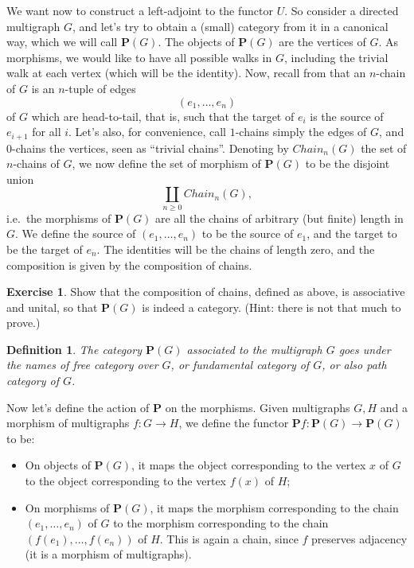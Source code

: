 \documentclass[12pt,oneside,headings=small]{scrbook}
\numberwithin{equation}{section}
\theoremstyle{plain}
\newtheorem{deph}[thm]{Definition}
\theoremstyle{definition}
\newtheorem{ex}[thm]{Exercise}
\newcommand{\cat}[1]{{\mathbf{#1}}} %
\DeclareMathOperator{\1}{\mathbbm{1}}
\DeclareMathOperator{\2}{\mathbbm{2}}
\begin{document}
We want now to construct a left-adjoint to the functor $U$. So consider a directed multigraph $G$, and let's try to obtain a (small) category from it in a canonical way, which we will call $\cat{P}(G)$. The objects of $\cat{P}(G)$ are the vertices of $G$. As morphisms, we would like to have all possible walks in $G$, including the trivial walk at each vertex (which will be the identity). Now, recall from  that an $n$-chain of $G$ is an $n$-tuple of edges 
$$
(e_1,\dots,e_n)
$$ 
of $G$ which are head-to-tail, that is, such that the target of $e_i$ is the source of $e_{i+1}$ for all $i$. Let's also, for convenience, call $1$-chains simply the edges of $G$, and $0$-chains the vertices, seen as ``trivial chains''. Denoting by $\mathit{Chain}_n(G)$ the set of $n$-chains of $G$, we now define the set of morphism of $\cat{P}(G)$ to be the disjoint union
$$
\coprod_{n\ge 0} \mathit{Chain}_n(G) ,
$$
i.e.~the morphisms of $\cat{P}(G)$ are all the chains of arbitrary (but finite) length in $G$. We define the source of $(e_1,\dots,e_n)$ to be the source of $e_1$, and the target to be the target of $e_n$. The identities will be the chains of length zero, and the composition is given by the composition of chains. 

\begin{ex}
 Show that the composition of chains, defined as above, is associative and unital, so that $\cat{P}(G)$ is indeed a category. (Hint: there is not that much to prove.)
\end{ex}

\begin{deph}
 The category $\cat{P}(G)$ associated to the multigraph $G$ goes under the names of \emph{free category over $G$}, or \emph{fundamental category of $G$}, or also \emph{path category of $G$}. 
\end{deph}


Now let's define the action of $\cat{P}$ on the morphisms. Given multigraphs $G,H$ and a morphism of multigraphs $f:G\to H$, we define the functor $\cat{P}f:\cat{P}(G)\to\cat{P}(G)$ to be:
\begin{itemize}
 \item On objects of $\cat{P}(G)$, it maps the object corresponding to the vertex $x$ of $G$ to the object corresponding to the vertex $f(x)$ of $H$;
 \item On morphisms of $\cat{P}(G)$, it maps the morphism corresponding to the chain $(e_1,\dots,e_n)$ of $G$ to the morphism corresponding to the chain $(f(e_1),\dots,f(e_n))$ of $H$. This is again a chain, since $f$ preserves adjacency (it is a morphism of multigraphs).
\end{itemize}
\end{document}
